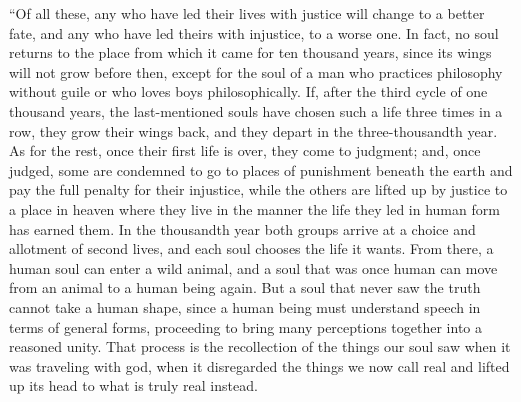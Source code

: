 “Of all these, any who have led their lives with justice will change to
a better fate, and any who have led theirs with injustice, to a worse
one. In fact, no soul returns to the place from which it came for ten
thousand years, since its wings will not grow before
then, except for the soul of a man who practices philosophy without
guile or who loves boys philosophically. If, after the third cycle of
one thousand years, the last-mentioned souls have chosen such a life
three times in a row, they grow their wings back, and they depart in the
three-thousandth year. As for the rest, once their first life is over,
they come to judgment; and, once judged, some are condemned to go to
places of punishment beneath the earth and pay the full penalty for
their injustice, while the others are lifted up by justice to a place in
heaven where they live in the manner the life they led in human 
form has earned them. In the thousandth year both groups arrive at a
choice and allotment of second lives, and each soul chooses the life it
wants. From there, a human soul can enter a wild animal, and a soul that
was once human can move from an animal to a human being again. But a
soul that never saw the truth cannot take a human shape, since a human
being must understand speech in terms of general forms, proceeding to 
bring many perceptions together into a reasoned
unity. That process is
the recollection of the things our soul saw when it was traveling with
god, when it disregarded the things we now call real and lifted up its
head to what is truly real instead.

